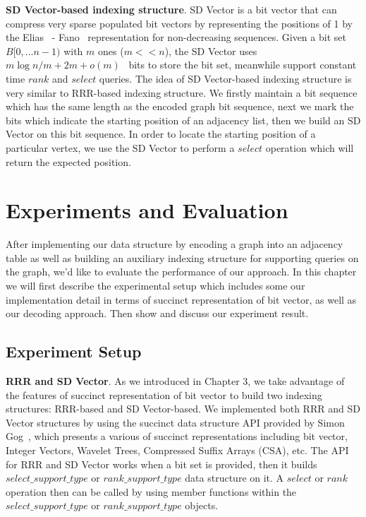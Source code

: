 \documentclass[12pt,glossary]{dalthesis}
\begin{document}
\bigskip
\bigskip

\textbf{SD Vector-based indexing structure}. SD Vector is a bit vector that can compress very sparse populated bit vectors by representing the positions of 1 by the Elias~\cite{Elias} - Fano~\cite{Fano} representation for non-decreasing sequences. Given a bit set $B[0,...n-1)$ with $m$ ones ($m << n$),   the SD Vector uses $m \log n/m  + 2m + o(m)$~\cite{Practical-Entropy} bits to store the bit set, meanwhile support constant time $rank$ and $select$ queries. The idea of SD Vector-based indexing structure is very similar to RRR-based indexing structure. We firstly maintain a bit sequence which has the same length as the encoded graph bit sequence, next we mark the bits which indicate the starting position of an adjacency list, then we build an SD Vector on this bit sequence. In order to locate the starting position of a particular vertex, we use the SD Vector to perform a $select$ operation which will return the expected position. 


\chapter{Experiments and Evaluation}
After implementing our data structure by encoding a graph into an adjacency table as well as building an auxiliary indexing structure for supporting queries on the graph, we'd like to evaluate the performance of our approach. In this chapter we will first describe the experimental setup which includes some our implementation detail in terms of succinct representation of bit vector, as well as our decoding approach. Then show and discuss our experiment result.

\bigskip
 
\section{Experiment Setup}

\bigskip
\textbf{RRR and SD Vector}. As we introduced in Chapter 3, we take advantage of the features of succinct representation of bit vector to build two indexing structures: RRR-based and SD Vector-based. We implemented both RRR and SD Vector structures by using the succinct data structure API provided by Simon Gog~\cite{sdsl}, which presents a various of succinct representations including bit vector, Integer Vectors, Wavelet Trees, Compressed Suffix Arrays (CSA), etc. The API for RRR and SD Vector works when a bit set is provided, then it builds $select\_support\_type$ or $rank\_support\_type$ data structure on it. A $select$ or $rank$ operation then can be called by using member functions within the $select\_support\_type$ or $rank\_support\_type$ objects.  
\end{document}
